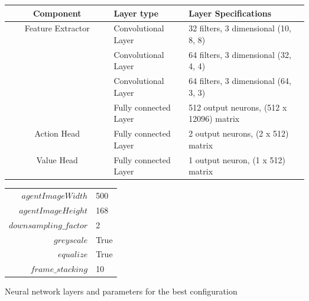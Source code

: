 
\begin{figure}
    \begin{center}
    \begin{tabular}{|| c | p{0.25\linewidth} | p{0.4\linewidth} ||} 
        \hline
        Component & Layer type & Layer Specifications \\ [0.5ex] 
        \hline\hline
        \multirow{4}{*}{Feature Extractor} & Convolutional Layer & 32 filters, 3 dimensional (10, 8, 8) \\\cline{2-3}
        & Convolutional Layer & 64 filters, 3 dimensional (32, 4, 4) \\\cline{2-3}
        & Convolutional Layer & 64 filters, 3 dimensional (64, 3, 3) \\\cline{2-3}
        & Fully connected Layer & 512 output neurons, (512 x 12096) matrix \\
        \hline
        Action Head & Fully connected Layer & 2 output neurons, (2 x 512) matrix \\
        \hline
        Value Head & Fully connected Layer & 1 output neuron, (1 x 512) matrix \\
        \hline
    \end{tabular}
    \begin{tabular}{r@{: }l}
        $agentImageWidth$ & 500 \\
        $agentImageHeight$ & 168 \\
        $downsampling\_factor$ & 2 \\
        $greyscale$ & True \\
        $equalize$ & True \\
        $frame\_stacking$ & 10 \\
    \end{tabular}
    \end{center}
    \caption{Neural network layers and parameters for the best configuration}
    \label{fig:network_architecture}
\end{figure}



